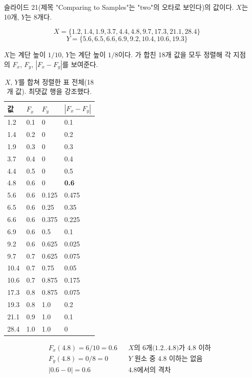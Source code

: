 \begin{example}[표본 $X$ 대 $Y$]
\label{ex:cd-ks-two}
슬라이드 21(제목 "Comparing to Samples"는 "two"의 오타로 보인다)의
값이다. $X$는 10개, $Y$는 8개다.

\[
  X = \{1.2, 1.4, 1.9, 3.7, 4.4, 4.8, 9.7, 17.3, 21.1, 28.4\}
\]
\[
  Y = \{5.6, 6.5, 6.6, 6.9, 9.2, 10.4, 10.6, 19.3\}
\]

$X$는 계단 높이 $1/10$, $Y$는 계단 높이 $1/8$이다.
가 합친 18개 값을 모두 정렬해 각 지점의
$F_x$, $F_y$, $|F_x - F_y|$를 보여준다.

\begin{table}[H]\centering
\begin{tabularx}{\linewidth}{@{}l X X X@{}}
\toprule
값 & $F_x$ & $F_y$ & $|F_x - F_y|$ \\
\midrule
1.2 & 0.1 & 0 & 0.1 \\
\midrule
1.4 & 0.2 & 0 & 0.2 \\
\midrule
1.9 & 0.3 & 0 & 0.3 \\
\midrule
3.7 & 0.4 & 0 & 0.4 \\
\midrule
4.4 & 0.5 & 0 & 0.5 \\
\midrule
4.8 & 0.6 & 0 & \textbf{0.6} \\
\midrule
5.6 & 0.6 & 0.125 & 0.475 \\
\midrule
6.5 & 0.6 & 0.25 & 0.35 \\
\midrule
6.6 & 0.6 & 0.375 & 0.225 \\
\midrule
6.9 & 0.6 & 0.5 & 0.1 \\
\midrule
9.2 & 0.6 & 0.625 & 0.025 \\
\midrule
9.7 & 0.7 & 0.625 & 0.075 \\
\midrule
10.4 & 0.7 & 0.75 & 0.05 \\
\midrule
10.6 & 0.7 & 0.875 & 0.175 \\
\midrule
17.3 & 0.8 & 0.875 & 0.075 \\
\midrule
19.3 & 0.8 & 1.0 & 0.2 \\
\midrule
21.1 & 0.9 & 1.0 & 0.1 \\
\midrule
28.4 & 1.0 & 1.0 & 0 \\
\bottomrule
\end{tabularx}
\caption{$X$, $Y$를 합쳐 정렬한 표 전체(18개 값). 최댓값 행을
강조했다.}
\label{tab:cd-ks-two}
\end{table}

\begin{align*}
  &F_x(4.8) = 6/10 = 0.6 && \text{$X$의 6개(1.2..4.8)가 4.8 이하}\\
  &F_y(4.8) = 0/8 = 0 && \text{$Y$ 원소 중 4.8 이하는 없음}\\
  &|0.6 - 0| = 0.6 && \text{4.8에서의 격차}
\end{align*}


\end{example}
